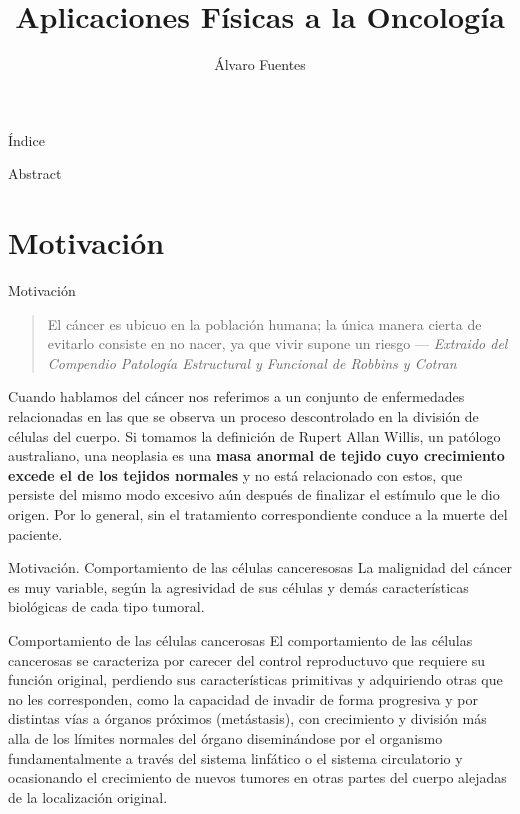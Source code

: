 \documentclass{beamer}
\title[Aplicaciones Físicas a la Oncología]{Aplicaciones Físicas a la Oncología}
\author[Fuentes]{Álvaro Fuentes}
\institute[UCO]{Universidad de Córdoba}
\begin{document}
\begin{frame}
    \titlepage
\end{frame}

\begin{frame}{Índice}
    \tableofcontents
\end{frame}
\begin{frame}{Abstract}
    
\end{frame}
\section{Motivación}
\begin{frame}{Motivación}
\begin{center}
   \begin{quote}
    El cáncer es ubicuo en la población humana; la única manera cierta de evitarlo consiste en no nacer, ya que vivir supone un riesgo
    --- \textit{Extraido del Compendio Patología Estructural y Funcional de Robbins y Cotran}
\end{quote} 
\end{center}

Cuando hablamos del cáncer nos referimos a un conjunto de enfermedades relacionadas en las que se observa un proceso descontrolado en la división de células del cuerpo. Si tomamos la definición de Rupert Allan Willis, un patólogo australiano, una neoplasia es una \textbf{masa anormal de tejido cuyo crecimiento excede el de los tejidos normales} y no está relacionado con estos, que persiste del mismo modo excesivo aún después de finalizar el estímulo que le dio origen. Por lo general, sin el tratamiento correspondiente conduce a la muerte del paciente.
\end{frame}

\begin{frame}{Motivación. Comportamiento de las células canceresosas } La malignidad del cáncer es muy variable, según la agresividad de sus células y demás características biológicas de cada tipo tumoral.  

\begin{block}{Comportamiento de las células cancerosas}
    El comportamiento de las células cancerosas se caracteriza por carecer del control reproductuvo que requiere su función original, perdiendo sus características primitivas y adquiriendo otras que no les corresponden, como la capacidad de invadir de forma progresiva y por distintas vías a órganos próximos (metástasis), con crecimiento y división más alla de los límites normales del órgano diseminándose por el organismo fundamentalmente a través del sistema linfático o el sistema circulatorio y ocasionando el crecimiento de nuevos tumores en otras partes del cuerpo alejadas de la localización original.  
\end{block}
\end{frame}
\end{document}
